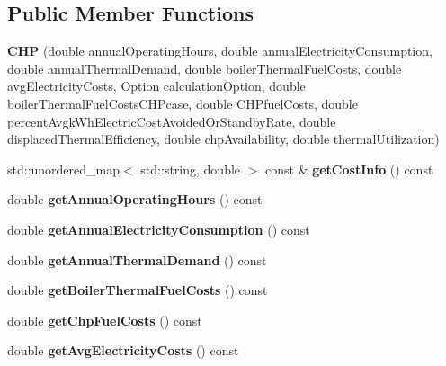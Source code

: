 \subsection*{Public Member Functions}
\begin{DoxyCompactItemize}
\item 
\mbox{\label{class_c_h_p_aea45a2afd5189214fbf720e53d587640}} 
{\bfseries C\+HP} (double annual\+Operating\+Hours, double annual\+Electricity\+Consumption, double annual\+Thermal\+Demand, double boiler\+Thermal\+Fuel\+Costs, double avg\+Electricity\+Costs, Option calculation\+Option, double boiler\+Thermal\+Fuel\+Costs\+C\+H\+Pcase, double C\+H\+Pfuel\+Costs, double percent\+Avgk\+Wh\+Electric\+Cost\+Avoided\+Or\+Standby\+Rate, double displaced\+Thermal\+Efficiency, double chp\+Availability, double thermal\+Utilization)
\item 
\mbox{\label{class_c_h_p_a9b448b253454087f9e98124aa716715f}} 
std\+::unordered\+\_\+map$<$ std\+::string, double $>$ const  \& {\bfseries get\+Cost\+Info} () const
\item 
\mbox{\label{class_c_h_p_aeeb03f1f40db034babf883a1e00ed2a3}} 
double {\bfseries get\+Annual\+Operating\+Hours} () const
\item 
\mbox{\label{class_c_h_p_a37d544d03c45668a9dc5d502cdcb6137}} 
double {\bfseries get\+Annual\+Electricity\+Consumption} () const
\item 
\mbox{\label{class_c_h_p_a849a576483b92b131ebfc0615e1e0bdb}} 
double {\bfseries get\+Annual\+Thermal\+Demand} () const
\item 
\mbox{\label{class_c_h_p_a9f6c6638b1be7c2df8ba4b406c3b2b94}} 
double {\bfseries get\+Boiler\+Thermal\+Fuel\+Costs} () const
\item 
\mbox{\label{class_c_h_p_a00929ba5d10367258dc1dc437eda88e3}} 
double {\bfseries get\+Chp\+Fuel\+Costs} () const
\item 
\mbox{\label{class_c_h_p_a2bc5ac0eb3d7ce42f77f26b3973f6c9f}} 
double {\bfseries get\+Avg\+Electricity\+Costs} () const
\item 
\mbox{\label{class_c_h_p_a858f0201818f637331e0d06d3171bee7}} 

\end{DoxyCompactItemize}
